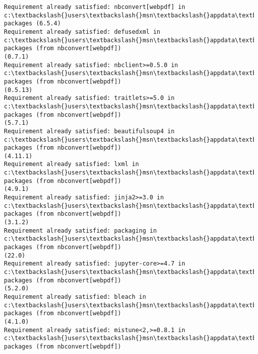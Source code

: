 \documentclass[11pt]{article}
\begin{document}
    \begin{Verbatim}[commandchars=\\\{\}]
Requirement already satisfied: nbconvert[webpdf] in
c:\textbackslash{}users\textbackslash{}msn\textbackslash{}appdata\textbackslash{}local\textbackslash{}anaconda3\textbackslash{}lib\textbackslash{}site-packages (6.5.4)
Requirement already satisfied: defusedxml in
c:\textbackslash{}users\textbackslash{}msn\textbackslash{}appdata\textbackslash{}local\textbackslash{}anaconda3\textbackslash{}lib\textbackslash{}site-packages (from nbconvert[webpdf])
(0.7.1)
Requirement already satisfied: nbclient>=0.5.0 in
c:\textbackslash{}users\textbackslash{}msn\textbackslash{}appdata\textbackslash{}local\textbackslash{}anaconda3\textbackslash{}lib\textbackslash{}site-packages (from nbconvert[webpdf])
(0.5.13)
Requirement already satisfied: traitlets>=5.0 in
c:\textbackslash{}users\textbackslash{}msn\textbackslash{}appdata\textbackslash{}local\textbackslash{}anaconda3\textbackslash{}lib\textbackslash{}site-packages (from nbconvert[webpdf])
(5.7.1)
Requirement already satisfied: beautifulsoup4 in
c:\textbackslash{}users\textbackslash{}msn\textbackslash{}appdata\textbackslash{}local\textbackslash{}anaconda3\textbackslash{}lib\textbackslash{}site-packages (from nbconvert[webpdf])
(4.11.1)
Requirement already satisfied: lxml in
c:\textbackslash{}users\textbackslash{}msn\textbackslash{}appdata\textbackslash{}local\textbackslash{}anaconda3\textbackslash{}lib\textbackslash{}site-packages (from nbconvert[webpdf])
(4.9.1)
Requirement already satisfied: jinja2>=3.0 in
c:\textbackslash{}users\textbackslash{}msn\textbackslash{}appdata\textbackslash{}local\textbackslash{}anaconda3\textbackslash{}lib\textbackslash{}site-packages (from nbconvert[webpdf])
(3.1.2)
Requirement already satisfied: packaging in
c:\textbackslash{}users\textbackslash{}msn\textbackslash{}appdata\textbackslash{}local\textbackslash{}anaconda3\textbackslash{}lib\textbackslash{}site-packages (from nbconvert[webpdf])
(22.0)
Requirement already satisfied: jupyter-core>=4.7 in
c:\textbackslash{}users\textbackslash{}msn\textbackslash{}appdata\textbackslash{}local\textbackslash{}anaconda3\textbackslash{}lib\textbackslash{}site-packages (from nbconvert[webpdf])
(5.2.0)
Requirement already satisfied: bleach in
c:\textbackslash{}users\textbackslash{}msn\textbackslash{}appdata\textbackslash{}local\textbackslash{}anaconda3\textbackslash{}lib\textbackslash{}site-packages (from nbconvert[webpdf])
(4.1.0)
Requirement already satisfied: mistune<2,>=0.8.1 in
c:\textbackslash{}users\textbackslash{}msn\textbackslash{}appdata\textbackslash{}local\textbackslash{}anaconda3\textbackslash{}lib\textbackslash{}site-packages (from nbconvert[webpdf])

\end{Verbatim}
\end{document}
